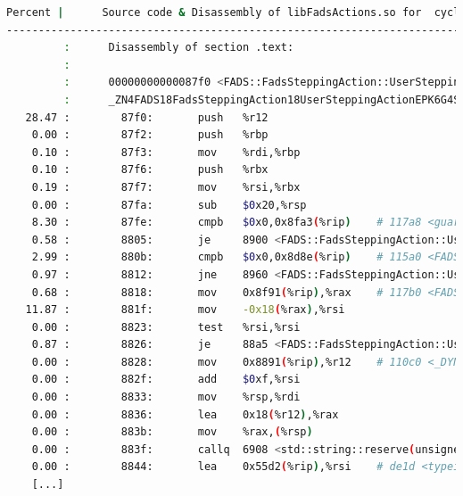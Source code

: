 \documentclass[a4paper]{jpconf}
\begin{document}
\begin{appendices}
\begin{lstlisting}[basicstyle=\ttfamily\tiny, language=bash,
caption=FADS::FadsSteppingAction::UserSteppingAction cycles annotation]
Percent |      Source code & Disassembly of libFadsActions.so for  cycles:pp
-----------------------------------------------------------------------------
         :      Disassembly of section .text:
         :
         :      00000000000087f0 <FADS::FadsSteppingAction::UserSteppingAction(G4Step const*)>:
         :      _ZN4FADS18FadsSteppingAction18UserSteppingActionEPK6G4Step():
   28.47 :        87f0:       push   %r12
    0.00 :        87f2:       push   %rbp
    0.10 :        87f3:       mov    %rdi,%rbp
    0.10 :        87f6:       push   %rbx
    0.19 :        87f7:       mov    %rsi,%rbx
    0.00 :        87fa:       sub    $0x20,%rsp
    8.30 :        87fe:       cmpb   $0x0,0x8fa3(%rip)    # 117a8 <guard variable for FADS::FadsSteppingAction::UserSteppingAction(...)::act>
    0.58 :        8805:       je     8900 <FADS::FadsSteppingAction::UserSteppingAction(G4Step const*)+0x110>
    2.99 :        880b:       cmpb   $0x0,0x8d8e(%rip)    # 115a0 <FADS::FadsSteppingAction::UserSteppingAction(G4Step const*)::first>
    0.97 :        8812:       jne    8960 <FADS::FadsSteppingAction::UserSteppingAction(G4Step const*)+0x170>
    0.68 :        8818:       mov    0x8f91(%rip),%rax    # 117b0 <FADS::FadsSteppingAction::UserSteppingAction(G4Step const*)::act>
   11.87 :        881f:       mov    -0x18(%rax),%rsi
    0.00 :        8823:       test   %rsi,%rsi
    0.87 :        8826:       je     88a5 <FADS::FadsSteppingAction::UserSteppingAction(G4Step const*)+0xb5>
    0.00 :        8828:       mov    0x8891(%rip),%r12    # 110c0 <_DYNAMIC+0x388>
    0.00 :        882f:       add    $0xf,%rsi
    0.00 :        8833:       mov    %rsp,%rdi
    0.00 :        8836:       lea    0x18(%r12),%rax
    0.00 :        883b:       mov    %rax,(%rsp)
    0.00 :        883f:       callq  6908 <std::string::reserve(unsigned long)@plt>
    0.00 :        8844:       lea    0x55d2(%rip),%rsi    # de1d <typeinfo name for FADS::FadsStackingAction+0x2d>
    [...]
\end{lstlisting}



\end{appendices}
\end{document}
